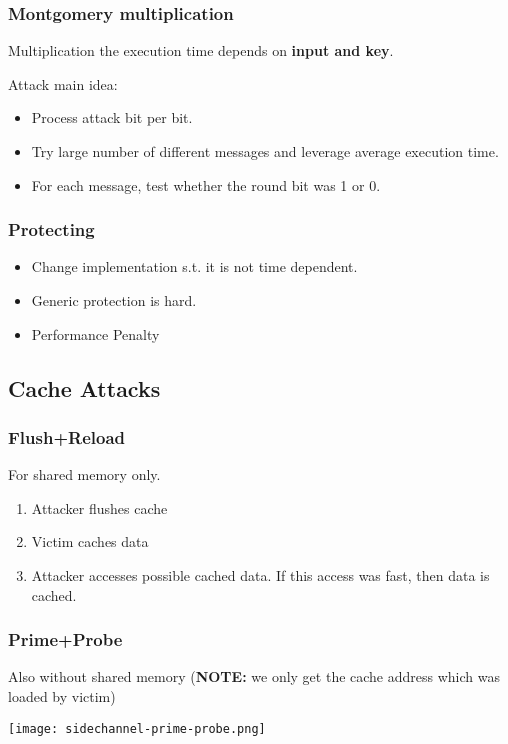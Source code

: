 \subsubsection{Montgomery multiplication}
Multiplication the execution time depends on \textbf{input and key}.

Attack main idea:
\begin{itemize}
  \item Process attack bit per bit.
  \item Try large number of different messages and leverage average execution
    time.
  \item For each message, test whether the round bit was 1 or 0.
\end{itemize}

\subsubsection{Protecting}
\begin{itemize}
  \item Change implementation s.t. it is not time dependent.
  \item Generic protection is hard.
  \item Performance Penalty
\end{itemize}


\subsection{Cache Attacks}
\subsubsection{Flush+Reload}
For shared memory only.
\begin{enumerate}
	\item Attacker flushes cache
	\item Victim caches data
	\item Attacker accesses possible cached data. If this access was fast,
	  then data is cached.
\end{enumerate}
\subsubsection{Prime+Probe}
    Also without shared memory (\textbf{NOTE:} we only get the cache address
    which was loaded by victim)

\texttt{[image: sidechannel-prime-probe.png]}


